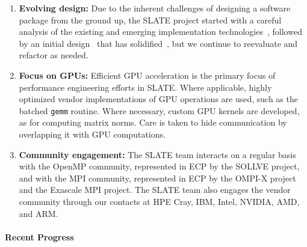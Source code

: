 \begin{enumerate}

\item
\textbf{Evolving design:}
Due to the inherent challenges of designing a software package
from the ground up, the SLATE project started
with a careful analysis of the existing and emerging
implementation technologies~\cite{abdelfattah2017roadmap},
followed by an initial design~\cite{kurzak2017designing}
that has solidified~\cite{gates2019slate-design},
but we continue to reevaluate and refactor as needed.

\item
\textbf{Focus on GPUs:}
Efficient GPU acceleration is the primary focus of performance
engineering efforts in SLATE.
Where applicable, highly optimized vendor implementations of GPU operations
are used, such as the batched \texttt{gemm} routine.
Where necessary, custom GPU kernels are developed, as for computing
matrix norms.
Care is taken to hide communication by overlapping it with GPU computations.

\item
\textbf{Community engagement:}
The SLATE team interacts on a regular basis with the OpenMP community,
represented in ECP by the SOLLVE project, and with the MPI community,
represented in ECP by the OMPI-X project and the Exascale MPI project.
The SLATE team also engages the vendor community through our contacts
at HPE Cray, IBM, Intel, NVIDIA, AMD, and ARM.

\end{enumerate}

\paragraph{Recent Progress}

